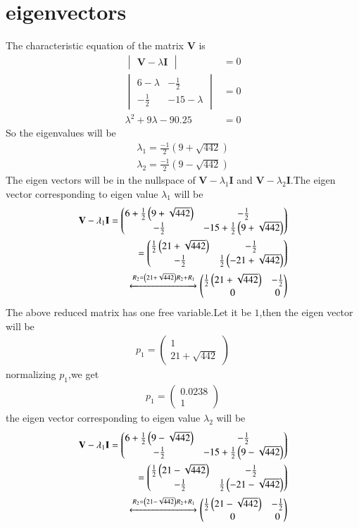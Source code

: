 \documentclass[journal,12pt,twocolumn]{IEEEtran}
\providecommand{\brak}[1]{\ensuremath{\left(#1\right)}}
\newcommand{\myvec}[1]{\ensuremath{\begin{pmatrix}#1\end{pmatrix}}}
\newcommand{\mydet}[1]{\ensuremath{\begin{vmatrix}#1\end{vmatrix}}}
\numberwithin{equation}{subsection}
\let\vec\mathbf
\begin{document}
\section{eigenvectors}
The characteristic equation of the matrix $\vec{V}$ is
\begin{align}
    \mydet{\vec{V}-\lambda\vec{I}}&=0\\
    \mydet{6-\lambda&-\frac{1}{2}\\-\frac{1}{2}&-15-\lambda}&=0\\
    \lambda^2+9\lambda-90.25&=0
\end{align}
So the eigenvalues will be
\begin{align}
    \lambda_1=\frac{-1}{2}\brak{9+\sqrt{442}}\\
    \lambda_2=\frac{-1}{2}\brak{9-\sqrt{442}}
\end{align}
The eigen vectors will be in the nullspace of $\vec{V}-\lambda_1\vec{I}$ and $\vec{V}-\lambda_2\vec{I}$.The eigen vector corresponding to eigen value $\lambda_1$ will be
\begin{align}
    \vec{V}-\lambda_1\vec{I}=\myvec{6+\frac{1}{2}\brak{9+\sqrt{442}}&-\frac{1}{2}\\-\frac{1}{2}&-15+\frac{1}{2}\brak{9+\sqrt{442}}}\\
    =\myvec{\frac{1}{2}\brak{21+\sqrt{442}}&-\frac{1}{2}\\-\frac{1}{2}&\frac{1}{2}\brak{-21+\sqrt{442}}}\\
    \xleftrightarrow[]{R_2=\brak{21+\sqrt{442}}R_2+R_1}\myvec{\frac{1}{2}\brak{21+\sqrt{442}}&-\frac{1}{2}\\0&0}
\end{align}
The above reduced matrix has one free variable.Let it be $1$,then the eigen vector will be
\begin{align}
    {p_1}=\myvec{1\\21+\sqrt{442}}
\end{align}
normalizing $p_1$,we get
\begin{align}
    p_1=\myvec{0.0238\\1}
\end{align}
the eigen vector corresponding to eigen value $\lambda_2$ will be
\begin{align}
    \vec{V}-\lambda_1\vec{I}=\myvec{6+\frac{1}{2}\brak{9-\sqrt{442}}&-\frac{1}{2}\\-\frac{1}{2}&-15+\frac{1}{2}\brak{9-\sqrt{442}}}\\
    =\myvec{\frac{1}{2}\brak{21-\sqrt{442}}&-\frac{1}{2}\\-\frac{1}{2}&\frac{1}{2}\brak{-21-\sqrt{442}}}\\
    \xleftrightarrow[]{R_2=\brak{21-\sqrt{442}}R_2+R_1}\myvec{\frac{1}{2}\brak{21-\sqrt{442}}&-\frac{1}{2}\\0&0}
\end{align}
\end{document}

